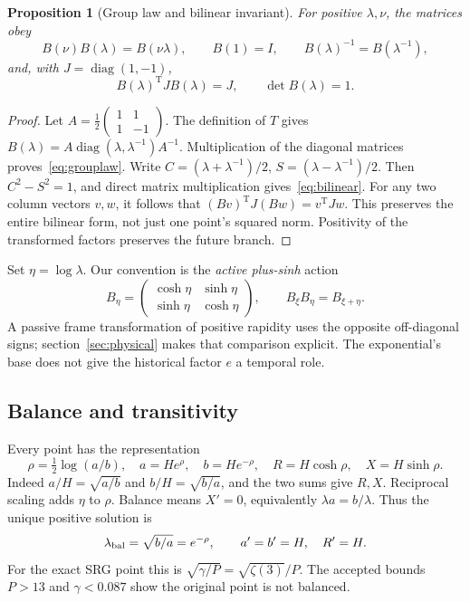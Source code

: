 \documentclass[11pt,a4paper]{article}
\newtheorem{proposition}[theorem]{Proposition}
\newcommand{\diag}{\operatorname{diag}}
\newcommand{\tr}{\mathrm T}
\begin{document}
\begin{proposition}[Group law and bilinear invariant]
For positive $\lambda,\nu$, the matrices obey
\begin{equation}
 B(\nu)B(\lambda)=B(\nu\lambda),\qquad B(1)=I,\qquad
 B(\lambda)^{-1}=B(\lambda^{-1}),
 \label{eq:grouplaw}
\end{equation}
and, with $J=\diag(1,-1)$,
\begin{equation}
 B(\lambda)^\tr J B(\lambda)=J,\qquad \det B(\lambda)=1.
 \label{eq:bilinear}
\end{equation}
\end{proposition}
\begin{proof}
Let $A=\tfrac12\begin{pmatrix}1&1\\1&-1\end{pmatrix}$. The definition of $T$ gives $B(\lambda)=A\diag(\lambda,\lambda^{-1})A^{-1}$. Multiplication of the diagonal matrices proves~\eqref{eq:grouplaw}. Write $C=(\lambda+\lambda^{-1})/2$, $S=(\lambda-\lambda^{-1})/2$. Then $C^2-S^2=1$, and direct matrix multiplication gives~\eqref{eq:bilinear}. For any two column vectors $v,w$, it follows that $(Bv)^\tr J(Bw)=v^\tr Jw$. This preserves the entire bilinear form, not just one point's squared norm. Positivity of the transformed factors preserves the future branch.
\end{proof}

Set $\eta=\log\lambda$. Our convention is the \emph{active plus-sinh} action
\begin{equation}
 B_\eta=\begin{pmatrix}\cosh\eta&\sinh\eta\\\sinh\eta&\cosh\eta\end{pmatrix},
 \qquad B_\xi B_\eta=B_{\xi+\eta}.
 \label{eq:rapidity}
\end{equation}
A passive frame transformation of positive rapidity uses the opposite off-diagonal signs; section~\ref{sec:physical} makes that comparison explicit. The exponential's base does not give the historical factor $e$ a temporal role.

\subsection{Balance and transitivity}
Every point has the representation
\begin{equation}
 \rho=\tfrac12\log(a/b),\quad
 a=H e^\rho,\quad b=H e^{-\rho},\quad
 R=H\cosh\rho,\quad X=H\sinh\rho.
 \label{eq:rho}
\end{equation}
Indeed $a/H=\sqrt{a/b}$ and $b/H=\sqrt{b/a}$, and the two sums give $R,X$. Reciprocal scaling adds $\eta$ to $\rho$. Balance means $X'=0$, equivalently $\lambda a=b/\lambda$. Thus the unique positive solution is
\begin{equation}
 \lambda_{\rm bal}=\sqrt{b/a}=e^{-\rho},\qquad
 a'=b'=H,\quad R'=H.
 \label{eq:balance}
\end{equation}
For the exact SRG point this is $\sqrt{\gamma/P}=\sqrt{\zeta(3)}/P$. The accepted bounds $P>13$ and $\gamma<0.087$ show the original point is not balanced.
\end{document}

